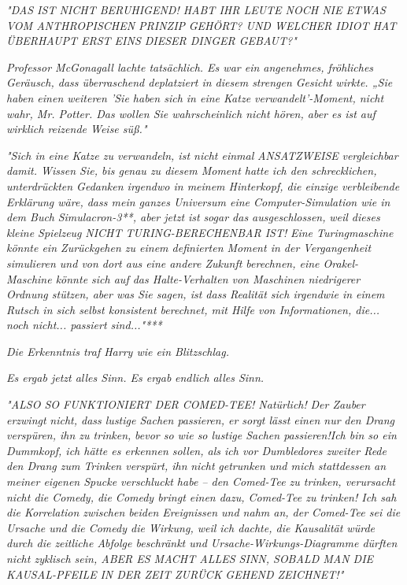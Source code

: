 {\emph{"\emph{DAS IST NICHT BERUHIGEND! HABT IHR LEUTE NOCH NIE ETWAS VOM ANTHROPISCHEN PRINZIP}} \emph{\emph{GEHÖRT? UND WELCHER IDIOT HAT ÜBERHAUPT ERST EINS DIESER DINGER GEBAUT?}"}

\emph{Professor McGonagall lachte tatsächlich. Es war ein angenehmes, fröhliches Geräusch, dass überraschend deplatziert in diesem strengen Gesicht wirkte. „Sie haben einen weiteren 'Sie haben sich in eine Katze verwandelt'-Moment, nicht wahr, Mr. Potter. Das wollen Sie wahrscheinlich nicht hören, aber es ist auf wirklich reizende Weise süß."}

\emph{"Sich in eine Katze zu verwandeln, ist nicht einmal} \emph{\emph{ANSATZWEISE}} \emph{vergleichbar damit. Wissen Sie, bis genau zu diesem Moment hatte ich den schrecklichen, unterdrückten Gedanken irgendwo in meinem Hinterkopf, die einzige verbleibende Erklärung wäre, dass mein ganzes Universum eine Computer-Simulation wie in dem Buch} \emph{\emph{Simulacron-3}**, aber jetzt ist} \emph{\emph{sogar das ausgeschlossen,}} \emph{weil dieses kleine Spielzeug} \emph{\emph{NICHT TURING-BERECHENBAR IST!}} \emph{Eine Turingmaschine könnte ein Zurückgehen zu einem definierten Moment in der Vergangenheit simulieren und von dort aus eine andere Zukunft berechnen, eine Orakel-Maschine könnte sich auf das Halte-Verhalten von Maschinen niedrigerer Ordnung stützen, aber was Sie sagen, ist dass Realität sich irgendwie in einem Rutsch in sich selbst konsistent berechnet, mit Hilfe von Informationen, die... noch nicht... passiert sind..."***}

\emph{Die Erkenntnis traf Harry wie ein Blitzschlag.}

\emph{Es ergab jetzt alles Sinn. Es ergab} \emph{\emph{endlich}} \emph{alles Sinn.}

\emph{"\emph{ALSO SO FUNKTIONIERT DER COMED-TEE! Natürlich!}} \emph{Der Zauber} \emph{\emph{erzwingt}} \emph{nicht, dass lustige Sachen passieren, er sorgt lässt einen nur} \emph{\emph{den Drang verspüren, ihn zu trinken,}} \emph{bevor so wie so lustige Sachen passieren!Ich bin so ein Dummkopf, ich hätte es erkennen sollen, als ich vor Dumbledores zweiter Rede den Drang zum Trinken verspürt, ihn} \emph{\emph{nicht}} \emph{getrunken und mich stattdessen an meiner eigenen Spucke verschluckt habe -- den Comed-Tee zu trinken, verursacht nicht die Comedy, die Comedy bringt einen dazu, Comed-Tee zu trinken! Ich sah die Korrelation zwischen beiden Ereignissen und nahm an, der Comed-Tee sei die Ursache und die Comedy die Wirkung, weil ich dachte, die Kausalität würde durch die zeitliche Abfolge beschränkt und Ursache-Wirkungs-Diagramme dürften nicht zyklisch sein, ABER ES MACHT ALLES SINN, SOBALD MAN DIE KAUSAL-PFEILE} \emph{\emph{IN DER ZEIT ZURÜCK}} \emph{GEHEND ZEICHNET!"}

}
